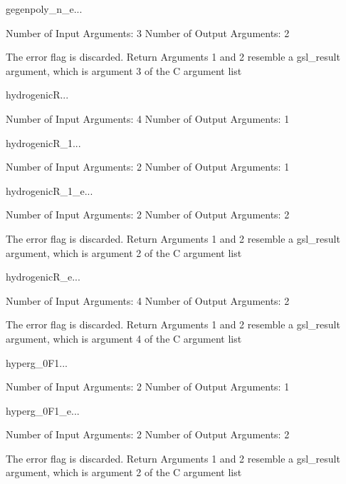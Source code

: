 \begin{funcdesc}{gegenpoly_n_e}{...}

    Number of Input  Arguments:  3
    Number of Output Arguments:  2

The error flag is discarded.
Return Arguments 1 and 2 resemble a gsl_result argument,
	which is  argument 3 of the C argument list

\end{funcdesc}

\begin{funcdesc}{hydrogenicR}{...}

    Number of Input  Arguments:  4
    Number of Output Arguments:  1
\end{funcdesc}

\begin{funcdesc}{hydrogenicR_1}{...}

    Number of Input  Arguments:  2
    Number of Output Arguments:  1
\end{funcdesc}

\begin{funcdesc}{hydrogenicR_1_e}{...}

    Number of Input  Arguments:  2
    Number of Output Arguments:  2

The error flag is discarded.
Return Arguments 1 and 2 resemble a gsl_result argument,
	which is  argument 2 of the C argument list

\end{funcdesc}

\begin{funcdesc}{hydrogenicR_e}{...}

    Number of Input  Arguments:  4
    Number of Output Arguments:  2

The error flag is discarded.
Return Arguments 1 and 2 resemble a gsl_result argument,
	which is  argument 4 of the C argument list

\end{funcdesc}

\begin{funcdesc}{hyperg_0F1}{...}

    Number of Input  Arguments:  2
    Number of Output Arguments:  1
\end{funcdesc}

\begin{funcdesc}{hyperg_0F1_e}{...}

    Number of Input  Arguments:  2
    Number of Output Arguments:  2

The error flag is discarded.
Return Arguments 1 and 2 resemble a gsl_result argument,
	which is  argument 2 of the C argument list

\end{funcdesc}


